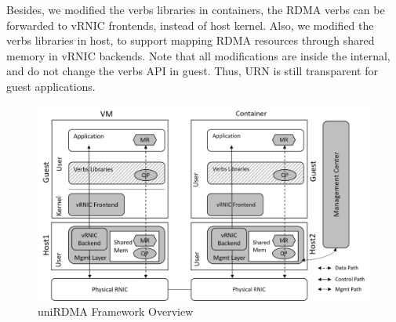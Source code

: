 Besides,  we modified the verbs libraries in containers,  the RDMA verbs can be forwarded to vRNIC frontends, instead of host kernel. Also, we modified the verbs libraries in host, to support mapping RDMA resources through shared memory in vRNIC backends. Note that all modifications are inside the internal, and do not change the verbs API in guest. Thus, URN is still transparent for guest applications.

\begin{figure}[!ht]
	\centering
	\includegraphics[width=1\linewidth]{images/framework-overview.png}
	\caption{uniRDMA Framework Overview}
	\label{fig:framework-overview}
\end{figure}